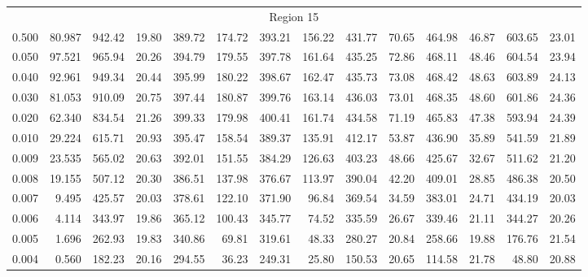 \begin{tabular}{@{}lrrrrrrrrrrrrr@{}}
\midrule
\multicolumn{14}{c}{Region 15} \\
\cmidrule{1-14}
0.500 & 80.987 & 942.42 & 19.80 & 389.72 & 174.72 & 393.21 & 156.22 & 431.77 & 70.65 & 464.98 & 46.87 & 603.65 & 23.01 \\
0.050 & 97.521 & 965.94 & 20.26 & 394.79 & 179.55 & 397.78 & 161.64 & 435.25 & 72.86 & 468.11 & 48.46 & 604.54 & 23.94 \\
0.040 & 92.961 & 949.34 & 20.44 & 395.99 & 180.22 & 398.67 & 162.47 & 435.73 & 73.08 & 468.42 & 48.63 & 603.89 & 24.13 \\
0.030 & 81.053 & 910.09 & 20.75 & 397.44 & 180.87 & 399.76 & 163.14 & 436.03 & 73.01 & 468.35 & 48.60 & 601.86 & 24.36 \\
0.020 & 62.340 & 834.54 & 21.26 & 399.33 & 179.98 & 400.41 & 161.74 & 434.58 & 71.19 & 465.83 & 47.38 & 593.94 & 24.39 \\
0.010 & 29.224 & 615.71 & 20.93 & 395.47 & 158.54 & 389.37 & 135.91 & 412.17 & 53.87 & 436.90 & 35.89 & 541.59 & 21.89 \\
0.009 & 23.535 & 565.02 & 20.63 & 392.01 & 151.55 & 384.29 & 126.63 & 403.23 & 48.66 & 425.67 & 32.67 & 511.62 & 21.20 \\
0.008 & 19.155 & 507.12 & 20.30 & 386.51 & 137.98 & 376.67 & 113.97 & 390.04 & 42.20 & 409.01 & 28.85 & 486.38 & 20.50 \\
0.007 & 9.495 & 425.57 & 20.03 & 378.61 & 122.10 & 371.90 & 96.84 & 369.54 & 34.59 & 383.01 & 24.71 & 434.19 & 20.03 \\
0.006 & 4.114 & 343.97 & 19.86 & 365.12 & 100.43 & 345.77 & 74.52 & 335.59 & 26.67 & 339.46 & 21.11 & 344.27 & 20.26 \\
0.005 & 1.696 & 262.93 & 19.83 & 340.86 & 69.81 & 319.61 & 48.33 & 280.27 & 20.84 & 258.66 & 19.88 & 176.76 & 21.54 \\
0.004 & 0.560 & 182.23 & 20.16 & 294.55 & 36.23 & 249.31 & 25.80 & 150.53 & 20.65 & 114.58 & 21.78 & 48.80 & 20.88 \\


\end{tabular}

